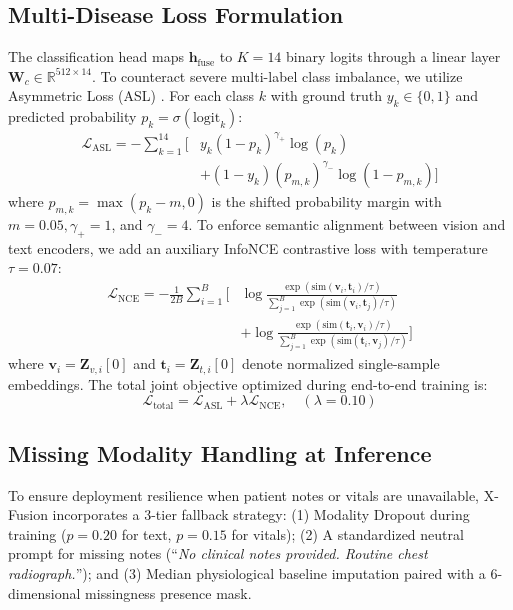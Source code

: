 \documentclass[conference]{IEEEtran}
\begin{document}
\subsection{Multi-Disease Loss Formulation}
The classification head maps $\mathbf{h}_{\text{fuse}}$ to $K=14$ binary logits through a linear layer $\mathbf{W}_c \in \mathbb{R}^{512 \times 14}$. To counteract severe multi-label class imbalance, we utilize Asymmetric Loss (ASL) \cite{ridnik2021}. For each class $k$ with ground truth $y_k \in \{0, 1\}$ and predicted probability $p_k = \sigma(\text{logit}_k)$:
\begin{equation}
\begin{aligned}
\mathcal{L}_{\text{ASL}} = -\sum_{k=1}^{14} \Big[ & y_k (1 - p_k)^{\gamma_+} \log(p_k) \\
& + (1 - y_k) (p_{m,k})^{\gamma_-} \log(1 - p_{m,k}) \Big]
\end{aligned}
\label{eq:asl}
\end{equation}
where $p_{m,k} = \max(p_k - m, 0)$ is the shifted probability margin with $m=0.05, \gamma_+ = 1$, and $\gamma_- = 4$. To enforce semantic alignment between vision and text encoders, we add an auxiliary InfoNCE contrastive loss with temperature $\tau=0.07$:
\begin{equation}
\begin{aligned}
\mathcal{L}_{\text{NCE}} = -\frac{1}{2B} \sum_{i=1}^B \Bigg[ & \log \frac{\exp(\text{sim}(\mathbf{v}_i, \mathbf{t}_i)/\tau)}{\sum_{j=1}^B \exp(\text{sim}(\mathbf{v}_i, \mathbf{t}_j)/\tau)} \\
& + \log \frac{\exp(\text{sim}(\mathbf{t}_i, \mathbf{v}_i)/\tau)}{\sum_{j=1}^B \exp(\text{sim}(\mathbf{t}_i, \mathbf{v}_j)/\tau)} \Bigg]
\end{aligned}
\label{eq:infonce}
\end{equation}
where $\mathbf{v}_i = \mathbf{Z}_{v, i}[0]$ and $\mathbf{t}_i = \mathbf{Z}_{t, i}[0]$ denote normalized single-sample embeddings. The total joint objective optimized during end-to-end training is:
\begin{equation}
\mathcal{L}_{\text{total}} = \mathcal{L}_{\text{ASL}} + \lambda \mathcal{L}_{\text{NCE}}, \quad (\lambda = 0.10)
\label{eq:total_loss}
\end{equation}

\subsection{Missing Modality Handling at Inference}
To ensure deployment resilience when patient notes or vitals are unavailable, X-Fusion incorporates a 3-tier fallback strategy: (1) Modality Dropout during training ($p=0.20$ for text, $p=0.15$ for vitals); (2) A standardized neutral prompt for missing notes (``\textit{No clinical notes provided. Routine chest radiograph.}''); and (3) Median physiological baseline imputation paired with a 6-dimensional missingness presence mask.
\end{document}
